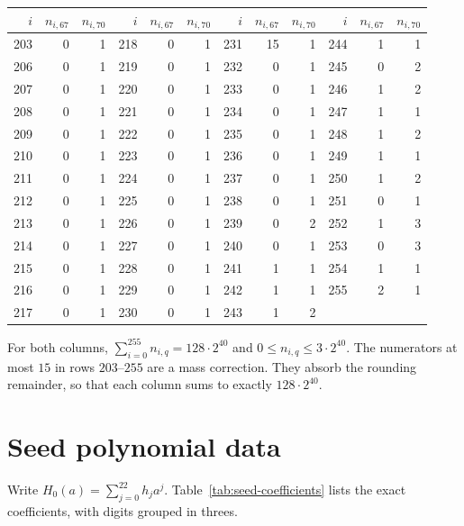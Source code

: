 \vspace{0.6\baselineskip}\noindent\begin{minipage}{\textwidth}
\begin{center}
\label{tab:energy-tail}
\begin{tabular}{@{}r r r@{\qquad}r r r@{\qquad}r r r@{\qquad}r r r@{}}
\toprule
$i$ & $n_{i,67}$ & $n_{i,70}$ & $i$ & $n_{i,67}$ & $n_{i,70}$ & $i$ & $n_{i,67}$ & $n_{i,70}$ & $i$ & $n_{i,67}$ & $n_{i,70}$\\
\midrule
203 & 0 & 1 & 218 & 0 & 1 & 231 & 15 & 1 & 244 & 1 & 1\\
206 & 0 & 1 & 219 & 0 & 1 & 232 & 0 & 1 & 245 & 0 & 2\\
207 & 0 & 1 & 220 & 0 & 1 & 233 & 0 & 1 & 246 & 1 & 2\\
208 & 0 & 1 & 221 & 0 & 1 & 234 & 0 & 1 & 247 & 1 & 1\\
209 & 0 & 1 & 222 & 0 & 1 & 235 & 0 & 1 & 248 & 1 & 2\\
210 & 0 & 1 & 223 & 0 & 1 & 236 & 0 & 1 & 249 & 1 & 1\\
211 & 0 & 1 & 224 & 0 & 1 & 237 & 0 & 1 & 250 & 1 & 2\\
212 & 0 & 1 & 225 & 0 & 1 & 238 & 0 & 1 & 251 & 0 & 1\\
213 & 0 & 1 & 226 & 0 & 1 & 239 & 0 & 2 & 252 & 1 & 3\\
214 & 0 & 1 & 227 & 0 & 1 & 240 & 0 & 1 & 253 & 0 & 3\\
215 & 0 & 1 & 228 & 0 & 1 & 241 & 1 & 1 & 254 & 1 & 1\\
216 & 0 & 1 & 229 & 0 & 1 & 242 & 1 & 1 & 255 & 2 & 1\\
217 & 0 & 1 & 230 & 0 & 1 & 243 & 1 & 2 &  &  & \\
\bottomrule
\end{tabular}
\end{center}
\end{minipage}
\normalsize

\vspace{1.2\baselineskip}\noindent For both columns, $\sum_{i=0}^{255}n_{i,q}=128\cdot2^{40}$ and $0\le n_{i,q}\le3\cdot2^{40}$.
The numerators at most $15$ in rows $203$--$255$ are a mass correction.
They absorb the rounding remainder, so that each column sums to exactly $128\cdot2^{40}$.
\clearpage
\section{Seed polynomial data}\label{app:seed}
Write $H_0(a)=\sum_{j=0}^{22}h_ja^j$. Table~\ref{tab:seed-coefficients} lists the exact coefficients, with digits grouped in threes.
\small
\renewcommand{\arraystretch}{1.12}

